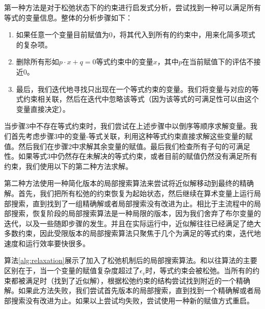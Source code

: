 第一种方法是对于松弛状态下的约束进行启发式分析，尝试找到一种可以满足所有等式的变量信息。整体的分析步骤如下：
\begin{enumerate}
    \item 如果任意一个变量目前赋值为0，将其代入到所有的约束中，用来化简多项式的复杂项。
    \item 删除所有形如$p \cdot x + q = 0$等式约束中的变量$x$，其中$p$在当前赋值下的评估不接近0。
    \item 最后，我们迭代地寻找只出现在一个等式约束的变量。我们将变量与对应的等式约束相关联，然后在迭代中忽略该等式（因为该等式的可满足性可以由这个变量直接决定）。
\end{enumerate}
当步骤3中不存在等式约束时，我们尝试在上述步骤中以倒序等顺序求解变量。我们首先考虑步骤3中的变量-等式关联，利用这种等式约束直接求解这些变量的赋值。然后我们在步骤2中求解其余变量的赋值。最后我们检查所有子句的可满足性。如果等式3中仍然存在未解决的等式约束，或者目前的赋值仍然没有满足所有约束，我们使用以下的第二种方法求解。

第二种方法使用一种简化版本的局部搜索算法来尝试将近似解移动到最终的精确解。首先，我们把所有松弛的约束恢复为起始状态，然后继续在算术变量上运行局部搜索，直到找到了一组精确解或者局部搜索没有改进为止。相比于主流程中的局部搜索，恢复阶段的局部搜索算法是一种局限的版本，因为我们舍弃了布尔变量的迭代，以及一些随即步骤的发生。并且在实际运行中，近似解往往已经满足了绝大多数约束，因此受限版本的局部搜索算法只聚焦于几个为满足的等式约束，迭代地速度和运行效率要快很多。

算法\ref{alg:relaxation}展示了加入了松弛机制后的局部搜索算法。和以往算法的主要区别在于，当一个变量的赋值复杂度超过了$\epsilon_v$时，等式约束会被松弛。当所有的约束都被满足时（找到了近似解），根据松弛约束的结构尝试找到附近的一个精确解。如果此方法失败，我们尝试首先版本的局部搜索，直到找到一个精确解或者局部搜索没有改进为止。如果以上尝试均失败，尝试使用一种新的赋值方式重启。

